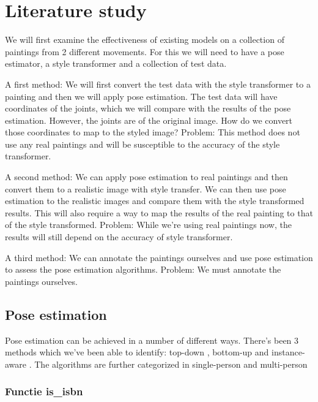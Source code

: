 \chapter{Literature study}
\label{chap:rel_work}

We will first examine the effectiveness of existing models on a collection of paintings from 2 different movements.
For this we will need to have a pose estimator, a style transformer and a collection of test data. 

A first method: We will first convert the test data with the style transformer to a painting and then we will apply pose estimation.
The test data will have coordinates of the joints, which we will compare with the results of the pose estimation.
However, the joints are of the original image. How do we convert those coordinates to map to the styled image? 
Problem: This method does not use any real paintings and will be susceptible to the accuracy of the style transformer.  

A second method: We can apply pose estimation to real paintings and then convert them to a realistic image with style transfer.
We can then use pose estimation to the realistic images and compare them with the style transformed results.
This will also require a way to map the results of the real painting to that of the style transformed. 
Problem: While we’re using real paintings now, the results will still depend on the accuracy of style transformer. 

A third method: We can annotate the paintings ourselves and use pose estimation to assess the pose estimation algorithms. 
Problem: We must annotate the paintings ourselves. 

\section{Pose estimation}
\label{sec:pose_estimation}

Pose estimation can be achieved in a number of different ways.
There's been 3 methods which we've been able to identify: top-down \cite{alphapose}, bottom-up \cite{blazepose} and instance-aware \cite{fcpose}.
The algorithms are further categorized in single-person \cite{blazepose} and multi-person \cite{alphapose}\cite{fcpose}

\subsection{Functie is\_isbn}